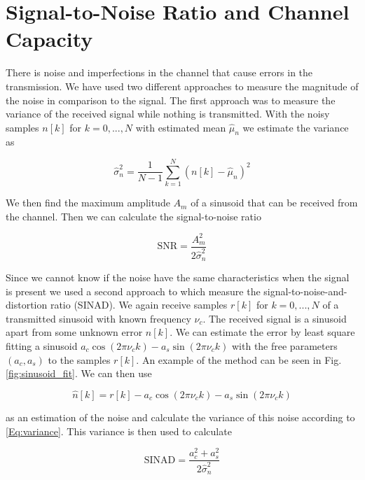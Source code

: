 \documentclass[12pt,a4paper,openright]{report}
\begin{document}
\section{Signal-to-Noise Ratio and Channel Capacity}

There is noise and imperfections in the channel that cause errors in the transmission. We have used two different approaches to measure the magnitude of the noise in comparison to the signal. The first approach was to measure the variance of the received signal while nothing is transmitted. With the noisy samples \(n[k]\) for \(k=0,... ,N\) with estimated mean \(\hat\mu_n\) we estimate the variance as


\begin{equation}\label{Eq:variance} \hat\sigma_n^2 = \frac{1}{N-1}\sum_{k=1}^N(n[k]-\hat\mu_n)^2 \end{equation}

We then find the maximum amplitude \(A_{m}\) of a sinusoid that can be received from the channel. Then we can calculate the signal-to-noise ratio

\begin{equation}\label{Eq:snr} \text{SNR} = \frac{A_{m}^2}{2 \hat\sigma_n^2} \end{equation}

Since we cannot know if the noise have the same characteristics when the signal is present we used a second approach to which measure the signal-to-noise-and-distortion ratio (SINAD). We again receive samples \(r[k]\) for \(k=0,... ,N\)  of a transmitted sinusoid with known frequency \(\nu_c\). The received signal is a sinusoid apart from some unknown error \(n[k]\). We can estimate the error by least square fitting a sinusoid \(a_c \cos(2\pi\nu_ck) - a_s \sin(2\pi\nu_ck)\) with the free parameters \((a_c,a_s)\) to the samples \(r[k]\). An example of the method can be seen in Fig.\ref{fig:sinusoid_fit}. We can then use

\begin{equation}\label{Eq:noise} \hat n[k] = r[k] - a_c \cos(2\pi\nu_ck) - a_s \sin(2\pi\nu_ck)\end{equation}

as an estimation of the noise and calculate the variance of this noise according to \eqref{Eq:variance}. This variance is then used to calculate

\begin{equation}\label{Eq:sinad} \text{SINAD} = \frac{a_c^2+a_s^2}{2\hat\sigma_n^2}\end{equation}
\end{document}
